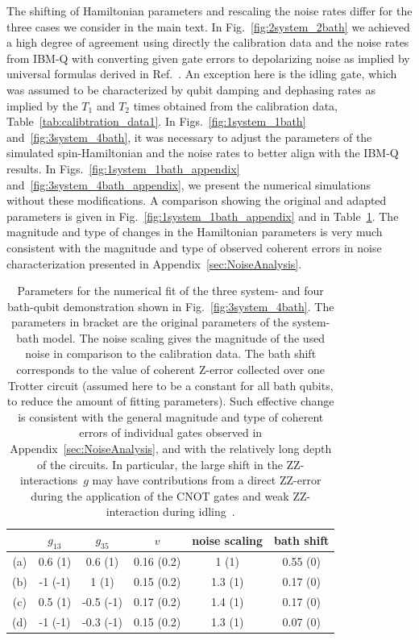 \documentclass[twocolumn,amsmath,amssymb,pra]{revtex4-2}
\begin{document}
The shifting of Hamiltonian parameters and rescaling the noise rates differ for the three cases we consider in the main text.
In Fig.~\ref{fig:2system_2bath} we achieved a high degree of agreement using directly the calibration data and the noise rates from IBM-Q
with converting given gate errors to depolarizing noise as implied by universal formulas derived in Ref.~\cite{Abad2022}.
An exception here is the idling gate, which was assumed to be characterized by qubit damping and dephasing rates as implied by the $T_1$ and $T_2$ times
obtained from the calibration data, Table~\ref{tab:calibtration_data1}.
In Figs.~\ref{fig:1system_1bath} and~\ref{fig:3system_4bath}, it was necessary to adjust the parameters of the simulated spin-Hamiltonian
and the noise rates to better align with the IBM-Q results.
In Figs.~\ref{fig:1system_1bath_appendix} and~\ref{fig:3system_4bath_appendix}, we present the numerical simulations without these modifications.
A comparison showing the original and adapted parameters is given in Fig.~\ref{fig:1system_1bath_appendix} and in Table~\ref{tab:parameters3s4b}.
The magnitude and type of changes in the Hamiltonian parameters is very much consistent with the magnitude and type of observed coherent errors in noise characterization presented in Appendix~\ref{sec:NoiseAnalysis}.
\begin{table}[ht]
\begin{tabular}{c|c|c|c|c|c}
    & $g_{13}$  & $g_{35}$      & $v$           & noise scaling   & bath shift  \\
\hline
(a) & 0.6 (1)   & 0.6 (1)       & 0.16 (0.2)    & 1 (1)           & 0.55 (0)    \\
(b) & -1 (-1)   & 1 (1)         & 0.15 (0.2)    & 1.3 (1)         & 0.17 (0)    \\
(c) & 0.5 (1)   & -0.5 (-1)     & 0.17 (0.2)    & 1.4 (1)         & 0.17 (0)    \\
(d) & -1 (-1)   & -0.3 (-1)     & 0.15 (0.2)    & 1.3 (1)         & 0.07 (0)    \\
\hline
\end{tabular}
\centering
\caption{Parameters for the numerical fit of the three system- and four bath-qubit demonstration shown in Fig.~\ref{fig:3system_4bath}.
The parameters in bracket are the original parameters of the system-bath model.
The noise scaling gives the magnitude of the used noise in comparison to the calibration data.
The bath shift corresponds to the value of coherent Z-error collected over one Trotter circuit
(assumed here to be a constant for all bath qubits, to reduce the amount of fitting parameters).
Such effective change is consistent with the general magnitude and type of coherent errors of individual gates observed in Appendix~\ref{sec:NoiseAnalysis},
and with the relatively long depth of the circuits.
In particular, the large shift in the ZZ-interactions~$g$ may have contributions from a
direct ZZ-error during the application of the CNOT gates and
weak ZZ-interaction during idling~\cite{Sheldon_2016}.
}
\label{tab:parameters3s4b}
\end{table}
\end{document}
